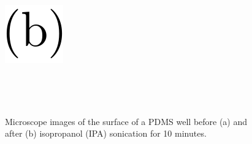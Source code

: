 \documentclass[
  a4paper,
]{scrbook}
\begin{document}
\begin{figure}
\begin{minipage}[t]{0.03\linewidth}
{{\includegraphics{figures/(b).png}

}

}

\end{minipage}%
%
\begin{minipage}[t]{0.01\linewidth}

{\centering 

~

}

\end{minipage}%
%
\begin{minipage}[t]{0.45\linewidth}

{\centering 


}

\end{minipage}%
%
\begin{minipage}[t]{0.01\linewidth}

{\centering 

~

}

\end{minipage}%

\caption{\label{fig-PDMS-clean}Microscope images of the surface of a
PDMS well before (a) and after (b) isopropanol (IPA) sonication for 10
minutes.}

\end{figure}
\end{document}
